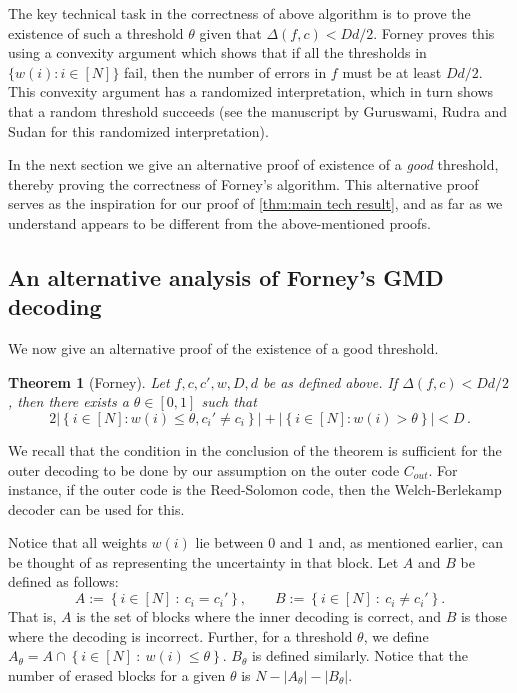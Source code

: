 \documentclass{article}
\newtheorem{theorem}{Theorem}\newtheorem{lemma}[theorem]{Lemma}\newtheorem{proposition}[theorem]{Proposition}\newtheorem{corollary}[theorem]{Corollary}\newtheorem{definition}[theorem]{Definition}\newtheorem{claim}[theorem]{Claim}\newtheorem{remark}[theorem]{Remark}\newtheorem{observation}[theorem]{Observation}
\def\inbrace#1{\left\{ #1 \right\}}
\def\setdef#1#2{\inbrace{ #1 \ \colon \ #2}}      %
\begin{document}
	The key technical task in the correctness of above algorithm is to
	prove the existence of such a threshold $\theta$ given that
	$\Delta(f, c) < Dd/2$. Forney proves this using a convexity argument
	which shows that if all the thresholds in
	$\{ w(i) \colon i \in [N] \}$ fail, then the number of errors in $f$
	must be at least $Dd/2$. This convexity argument has a randomized
	interpretation, which in turn shows that a random threshold succeeds
	(see the manuscript by Guruswami, Rudra and Sudan
	\cite[Section~12.3]{GuruswamiRS} for this randomized interpretation).
	
	In the next section we give an alternative proof of existence of a \emph{good} threshold, thereby proving the correctness of Forney's algorithm. This alternative proof serves as the inspiration for our proof of \cref{thm:main tech result}, and as far as we understand appears to be different from the above-mentioned proofs.
	
	\subsection{An alternative analysis of Forney's GMD decoding}\label{subsec: alternate_Forney}
	We now give an alternative proof of the existence of a good threshold.
	
	
	\begin{theorem}[Forney]\label{THM:GOOD_THRESHOLD_FORNEY}
		Let $f, c, c', w, D, d$ be as defined above. If $\Delta(f,c) < Dd/2$, then there exists a $\theta \in [0,1]$ such that 
		\[
		2\left| \left\{ i \in [N] \colon w(i) \leq  \theta, c_i' \neq c_i
		\right\} \right| + \left| \left\{ i \in [N] \colon w(i) > \theta \right\} \right| < D \, .
		\]
	\end{theorem}
	We recall that the condition in the conclusion of the theorem is sufficient for the outer decoding to be done by our assumption on the outer code $C_{out}$. For instance, if the outer code is the Reed-Solomon code, then the Welch-Berlekamp decoder can be used for this. 
	
	Notice that all weights $w(i)$ lie between $0$ and $1$ and, as mentioned earlier, can be thought of as representing the uncertainty in that block. 
	Let $A$ and $B$ be defined as follows:
	\[A := \setdef{i \in [N]}{c_i = c_i'}, \qquad B := \setdef{i \in
		[N]}{c_i \neq c_i'}.\]
	That is, $A$ is the set of blocks where the inner decoding is correct, and $B$ is those where the decoding is incorrect. Further, for a threshold $\theta$, we define $A_{\theta} = A \cap \setdef{i \in [N]}{w(i) \leq \theta}$. $B_{\theta}$ is defined similarly. Notice that the number of erased blocks for a given $\theta$ 
	is $N - |A_{\theta}| - |B_{\theta}|$.
	
\end{document}
